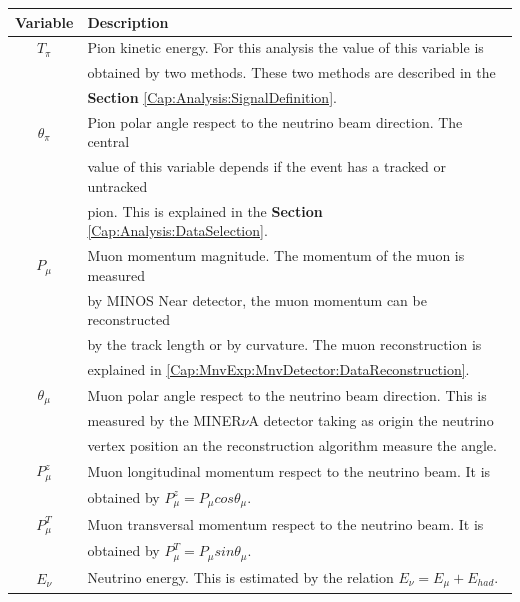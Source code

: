 \begin{table}[!htb]
    \centering
    \begin{tabular}{c|l}
        \hline
        Variable & Description \\ \hline
        $T_\pi$      & Pion kinetic energy. For this analysis the value of this variable is\\ 
                     & obtained by two methods. These two methods are described in the \\
                     & \textbf{Section} \ref{Cap:Analysis:SignalDefinition}. \\
        \hline
        $\theta_\pi$ & Pion polar angle respect to the neutrino beam direction. The central \\
                     & value of this variable depends if the event has a tracked or untracked \\
                     & pion. This is explained in the \textbf{Section} \ref{Cap:Analysis:DataSelection}. \\
        \hline
        $P_\mu$      & Muon momentum magnitude. The momentum of the muon is measured  \\
                     & by MINOS Near detector, the muon momentum can be reconstructed  \\
                     & by the track length or by curvature. The muon reconstruction is \\
                     & explained in \ref{Cap:MnvExp:MnvDetector:DataReconstruction}. \\
        \hline
        $\theta_\mu$ & Muon polar angle respect to the neutrino beam direction. This is \\
                     & measured by the MINER$\nu$A detector taking as origin the neutrino \\
                     & vertex position an the reconstruction algorithm measure the angle.\\
        \hline
        $P^z_\mu$    & Muon longitudinal momentum respect to the neutrino beam. It is \\ 
                     & obtained by $P^z_\mu = P_\mu cos \theta_\mu$. \\
        \hline
        $P^T_\mu$    & Muon transversal momentum respect to the neutrino beam. It is \\
                     & obtained by $P^T_\mu = P_\mu sin \theta_\mu$. \\
        \hline
        $E_\nu$      & Neutrino energy. This is estimated by the relation $E_\nu = E_\mu + E_{had}$. \\

\end{tabular}
\end{table}
